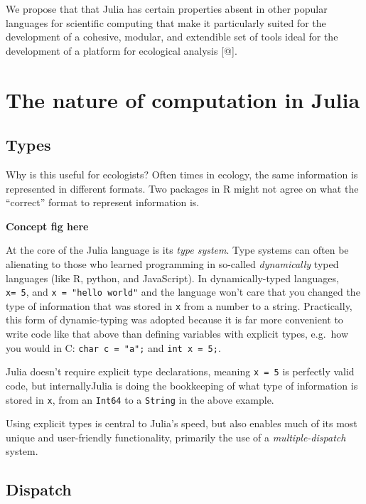 \documentclass[11pt]{article}
\begin{document}
We propose that that Julia has certain properties absent in other
popular languages for scientific computing that make it particularly
suited for the development of a cohesive, modular, and extendible set of
tools ideal for the development of a platform for ecological analysis
{[}@{]}.

\hypertarget{the-nature-of-computation-in-julia}{%
\section{The nature of computation in
Julia}\label{the-nature-of-computation-in-julia}}

\hypertarget{types}{%
\subsection{Types}\label{types}}

Why is this useful for ecologists? Often times in ecology, the same
information is represented in different formats. Two packages in R might
not agree on what the ``correct'' format to represent information is.

\textbf{Concept fig here}

At the core of the Julia language is its \emph{type system}. Type
systems can often be alienating to those who learned programming in
so-called \emph{dynamically} typed languages (like R, python, and
JavaScript). In dynamically-typed languages, \texttt{x=\ 5}, and
\texttt{x\ =\ "hello\ world"} and the language won't care that you
changed the type of information that was stored in \texttt{x} from a
number to a string. Practically, this form of dynamic-typing was adopted
because it is far more convenient to write code like that above than
defining variables with explicit types, e.g.~how you would in C:
\texttt{char\ c\ =\ "a";} and \texttt{int\ x\ =\ 5;}.

Julia doesn't require explicit type declarations, meaning
\texttt{x\ =\ 5} is perfectly valid code, but internallyJulia is doing
the bookkeeping of what type of information is stored in \texttt{x},
from an \texttt{Int64} to a \texttt{String} in the above example.

Using explicit types is central to Julia's speed, but also enables much
of its most unique and user-friendly functionality, primarily the use of
a \emph{multiple-dispatch} system.

\hypertarget{dispatch}{%
\subsection{Dispatch}\label{dispatch}}
\end{document}
